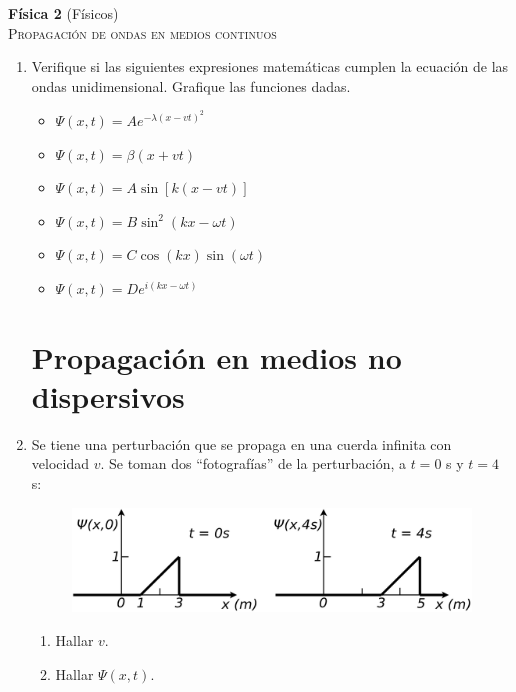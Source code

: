 \documentclass[11pt,spanish,a4paper]{article}
\begin{document}
\begin{center}
\textbf{Física 2} (Físicos) \hfill {}\\
	\textsc{\LARGE Propagación de ondas en medios continuos}
\end{center}



\begin{enumerate}

\item Verifique si las siguientes expresiones matemáticas cumplen la ecuación
de las ondas unidimensional. Grafique las funciones dadas.
\begin{itemize}
\item $\Psi(x,t)=Ae^{-\lambda(x-vt)^{2}}$
\item $\Psi(x,t)=\beta(x+vt)$
\item $\Psi(x,t)=A\sin\left[k(x-vt)\right]$
\item $\Psi(x,t)=B\sin^{2}\left(kx-\omega t\right)$
\item $\Psi(x,t)=C\cos(kx)\sin(\omega t)$
\item $\Psi(x,t)=De^{i(kx-\omega t)}$
\end{itemize}


\section*{Propagación en medios no dispersivos}

\item Se tiene una perturbación que se propaga en una cuerda infinita con
velocidad $v$. Se toman dos ``fotografías'' de la perturbación, a
$t=0$ s y $t=4$ s:
\begin{figure}[H]
\centering{}\includegraphics[clip,scale=0.25]{ej2-2}
\end{figure}
\begin{enumerate}
\item Hallar $v$.
\item Hallar $\Psi(x,t)$.
\end{enumerate}



\end{enumerate}
\end{document}
